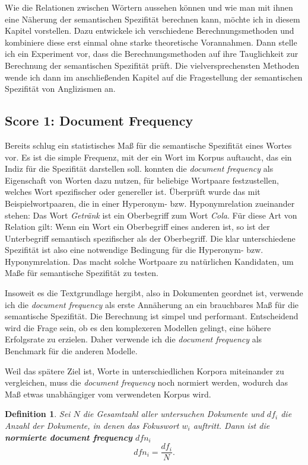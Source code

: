 \documentclass[11pt,numbers=noenddot]{scrartcl}
\newtheorem*{defi}{Definition}
\begin{document}
Wie die Relationen zwischen Wörtern aussehen können und wie man mit ihnen eine Näherung der semantischen Spezifität berechnen kann, möchte ich in diesem Kapitel vorstellen. Dazu entwickele ich verschiedene Berechnungsmethoden und kombiniere diese erst einmal ohne starke theoretische Vorannahmen. Dann stelle ich ein Experiment vor, dass die Berechnungsmethoden auf ihre Tauglichkeit zur Berechnung der semantischen Spezifität prüft. Die vielversprechensten Methoden wende ich dann im anschließenden Kapitel auf die Fragestellung der semantischen Spezifität von Anglizismen an.


\subsection{Score 1: Document Frequency} \label{df}
Bereits \citet{sparckjones1972} schlug ein statistisches Maß für die semantische Spezifität eines Wortes vor. Es ist die simple Frequenz, mit der ein Wort im Korpus auftaucht, das ein Indiz für die Spezifität darstellen soll. \citet{Caraballo99determiningthe} konnten die \emph{document frequency} als Eigenschaft von Worten dazu nutzen, für beliebige Wortpaare festzustellen, welches Wort  spezifischer oder genereller ist. Überprüft wurde das mit Beispielwortpaaren, die in einer Hyperonym- bzw. Hyponymrelation zueinander stehen: Das Wort \emph{Getränk} ist ein Oberbegriff zum Wort \emph{Cola}. Für diese Art von Relation gilt: Wenn ein Wort ein Oberbegriff eines anderen ist, so ist der Unterbegriff semantisch spezifischer als der Oberbegriff. Die klar unterschiedene Spezifität ist also eine notwendige Bedingung für die Hyperonym- bzw. Hyponymrelation. Das macht solche Wortpaare zu natürlichen Kandidaten, um Maße für semantische Spezifität zu testen.

Insoweit es die Textgrundlage hergibt, also in Dokumenten geordnet ist, verwende ich die \emph{document frequency} als erste Annäherung an ein brauchbares Maß für die semantische Spezifität. Die Berechnung ist simpel und performant. Entscheidend wird die Frage sein, ob es den komplexeren Modellen gelingt, eine höhere Erfolgsrate zu erzielen. Daher verwende ich die \emph{document frequency} als Benchmark für die anderen Modelle.

Weil das spätere Ziel ist, Worte in unterschiedlichen Korpora miteinander zu vergleichen, muss die \emph{document frequency} noch normiert werden, wodurch das Maß etwas unabhängiger vom verwendeten Korpus wird.

\begin{defi}
Sei $N$ die Gesamtzahl aller untersuchen Dokumente und $df_i$ die Anzahl der Dokumente, in denen das Fokuswort $w_i$ auftritt. Dann ist die \textbf{normierte document frequency} $dfn_i$
\begin{equation}
    dfn_i = \frac{df_i}{N}.
\end{equation}
\end{defi}
\end{document}
